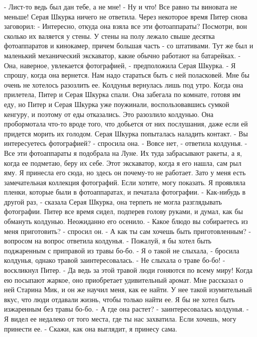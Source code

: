     - Лист-то ведь был дан тебе, а не мне!
    - Ну и что! Все равно ты виновата не меньше!
    Серая Шкурка ничего не ответила.
    Через некоторое время Питер снова заговорил:
    - Интересно, откуда она взяла все эти фотоаппараты? Посмотри, вон 
сколько их валяется у стены.
    У стены на полу лежало свыше десятка фотоаппаратов и кинокамер, 
причем большая часть - со штативами. Тут же был и маленький 
механический экскаватор, какие обычно работают на батарейках.
    - Она, наверное, увлекается фотографией, - предположила Серая 
Шкурка. - Я спрошу, когда она вернется. Нам надо стараться быть с ней 
поласковей. Мне бы очень не хотелось разозлить ее.
    Колдунья вернулась лишь под утро. Когда она прилетела, Питер и 
Серая Шкурка спали. Она забегала по комнате, готовя им еду, но Питер и 
Серая Шкурка уже поужинали, воспользовавшись сумкой кенгуру, и поэтому 
от еды отказались. Это разозлило колдунью. Она пробормотала что-то 
вроде того, что добьется от них послушания, даже если ей придется 
морить их голодом.
    Серая Шкурка попыталась наладить контакт.
    - Вы интересуетесь фотографией? - спросила она.
    - Вовсе нет, - ответила колдунья. - Все эти фотоаппараты я 
подобрала на Луне. Их туда забрасывают ракеты, а я, когда ее подметаю, 
беру их себе. Этот экскаватор, когда я его нашла, сам рыл яму. Я 
принесла его сюда, но здесь он почему-то не работает. Зато у меня есть 
замечательная коллекция фотографий. Если хотите, могу показать. Я 
проявляла пленки, которые были в фотоаппаратах, и печатала фотографии.
    - Как-нибудь в другой раз, - сказала Серая Шкурка, она терпеть не 
могла разглядывать фотографии.
    Питер все время сидел, подперев голову руками, и думал, как бы 
обмануть колдунью. Неожиданно его осенило.
    - Какое блюдо вы собираетесь из меня приготовить? - спросил он.
    - А как ты сам хочешь быть приготовленным? - вопросом на вопрос 
ответила колдунья.
    - Пожалуй, я бы хотел быть поджаренным с приправой из травы бо-бо.
    - Я о такой не слыхала, - бросила колдунья, однако травой 
заинтересовалась.
    - Не слыхала о траве бо-бо! - воскликнул Питер. - Да ведь за этой 
травой люди гоняются по всему миру! Когда ею посыпают жаркое, оно 
приобретает удивительный аромат. Мне рассказал о ней Старина Мик, и он 
же научил меня, как ее найти. У нее такой изумительный вкус, что люди 
отдавали жизнь, чтобы только найти ее. Я бы не хотел быть изжаренным 
без травы бо-бо.
    - А где она растет? - заинтересовалась колдунья.
    - Я видел ее недалеко от того места, где ты нас захватила. Если 
хочешь, могу принести ее.
    - Скажи, как она выглядит, я принесу сама.
